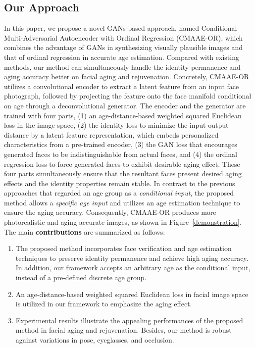 \documentclass{article}
\begin{document}
\subsection{Our Approach}

In this paper, we propose a novel GANs-based approach, named Conditional Multi-Adversarial Autoencoder with Ordinal Regression (CMAAE-OR), which combines the advantage of GANs in synthesizing visually plausible images and that of ordinal regression in accurate age estimation. Compared with existing methods, our method can simultaneously handle the identity permanence and aging accuracy better on facial aging and rejuvenation. Concretely, CMAAE-OR utilizes a convolutional encoder to extract a latent feature from an input face photograph, followed by projecting the feature onto the face manifold conditional on age through a deconvolutional generator. The encoder and the generator are trained with four parts, (1) an age-distance-based weighted squared Euclidean loss in the image space, (2) the identity loss to minimize the input-output distance by a latent feature representation, which embeds personalized characteristics from a pre-trained encoder, (3) the GAN loss that encourages generated faces to be indistinguishable from actual faces, and (4) the ordinal regression loss to force generated faces to exhibit desirable aging effect. These four parts simultaneously ensure that the resultant faces present desired aging effects and the identity properties remain stable. In contrast to the previous approaches that regarded an age group as a {\it conditional input}, the proposed method allows a {\it specific age input} and utilizes an age estimation technique to ensure the aging accuracy. Consequently, CMAAE-OR produces more photorealistic and aging accurate images, as shown in Figure~\ref{demonstration}.
The main {\bf contributions} are summarized as follows:
\begin{enumerate}
\item{The proposed method incorporates face verification and age estimation techniques to preserve identity permanence and achieve high aging accuracy. In addition, our framework accepts an arbitrary age as the conditional input, instead of a pre-defined discrete age group.}
\item{An age-distance-based weighted squared Euclidean loss in facial image space is utilized in our framework to emphasize the aging effect.}
\item{Experimental results illustrate the appealing performances of the proposed method in facial aging and rejuvenation. Besides, our method is robust against variations in pose, eyeglasses, and occlusion.}
\end{enumerate}
\end{document}
